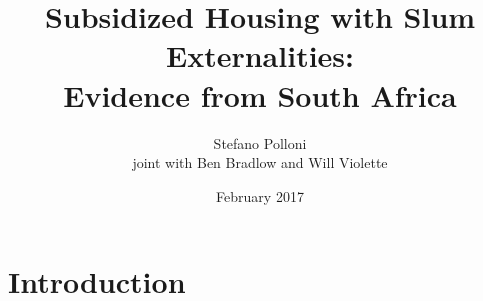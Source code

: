 \documentclass[aspectratio=149]{beamer}
\title{ Subsidized Housing with Slum Externalities: \\ Evidence from South Africa } %
\author{Stefano Polloni \\
joint with Ben Bradlow and Will Violette}
\date{February 2017} %
\begin{document}
\beamertemplatenavigationsymbolsempty

\begin{frame}
\titlepage %
\end{frame}


\section{Introduction}
\end{document}
